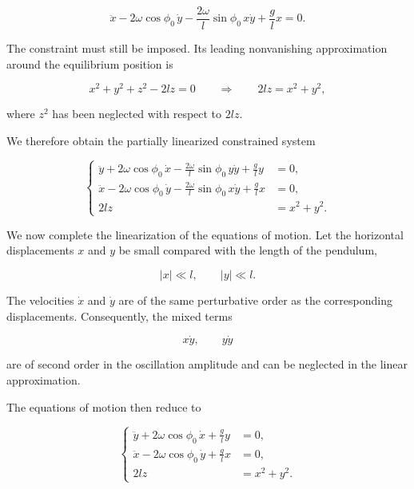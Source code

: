 \documentclass[12pt]{article}
\begin{document}
\begin{equation}
  \ddot{x}
  -
  2\omega\cos\phi_0\,\dot{y}
  -
  \frac{2\omega}{l}\sin\phi_0\,x\dot{y}
  +
  \frac{g}{l}x
  =
  0.
  \label{eq:foucault-x-partially-linearized}
\end{equation}

The constraint must still be imposed. Its leading nonvanishing approximation
around the equilibrium position is

\[
  x^2+y^2+z^2-2lz=0
  \qquad\Longrightarrow\qquad
  2lz=x^2+y^2,
\]

where \(z^2\) has been neglected with respect to \(2lz\).

We therefore obtain the partially linearized constrained system

\begin{equation}
  \left\{
  \begin{aligned}
    \ddot{y}
    +
    2\omega\cos\phi_0\,\dot{x}
    -
    \frac{2\omega}{l}\sin\phi_0\,y\dot{y}
    +
    \frac{g}{l}y
    &=
    0,
    \\[0.5em]
    \ddot{x}
    -
    2\omega\cos\phi_0\,\dot{y}
    -
    \frac{2\omega}{l}\sin\phi_0\,x\dot{y}
    +
    \frac{g}{l}x
    &=
    0,
    \\[0.5em]
    2lz
    &=
    x^2+y^2.
  \end{aligned}
  \right.
  \label{eq:foucault-partially-linearized-system}
\end{equation}

We now complete the linearization of the equations of motion. Let the horizontal
displacements \(x\) and \(y\) be small compared with the length of the pendulum,

\[
  |x|\ll l,
  \qquad
  |y|\ll l.
\]

The velocities \(\dot{x}\) and \(\dot{y}\) are of the same perturbative order as
the corresponding displacements. Consequently, the mixed terms

\[
  x\dot{y},
  \qquad
  y\dot{y}
\]

are of second order in the oscillation amplitude and can be neglected in the
linear approximation.

The equations of motion then reduce to

\begin{equation}
  \left\{
  \begin{aligned}
    \ddot{y}
    +
    2\omega\cos\phi_0\,\dot{x}
    +
    \frac{g}{l}y
    &=
    0,
    \\[0.4em]
    \ddot{x}
    -
    2\omega\cos\phi_0\,\dot{y}
    +
    \frac{g}{l}x
    &=
    0,
    \\[0.4em]
    2lz
    &=
    x^2+y^2.
  \end{aligned}
  \right.
  \label{eq:foucault-linearized-equations}
\end{equation}
\end{document}
